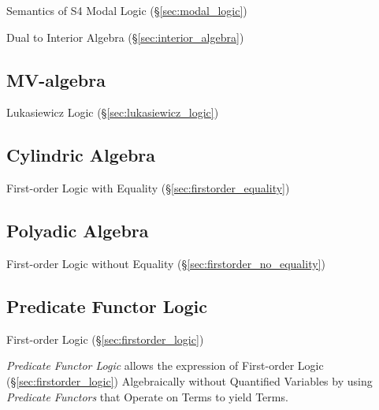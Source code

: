 Semantics of S4 Modal Logic (\S\ref{sec:modal_logic})

Dual to Interior Algebra (\S\ref{sec:interior_algebra})



\subsection{MV-algebra}\label{sec:mv_algebra}

Lukasiewicz Logic (\S\ref{sec:lukasiewicz_logic})



\subsection{Cylindric Algebra}\label{sec:cylindric_algebra}

First-order Logic with Equality (\S\ref{sec:firstorder_equality})



\subsection{Polyadic Algebra}\label{sec:polyadic_algebra}

First-order Logic without Equality
(\S\ref{sec:firstorder_no_equality})



\subsection{Predicate Functor Logic}\label{sec:pfl}

First-order Logic (\S\ref{sec:firstorder_logic})

\emph{Predicate Functor Logic} allows the expression of First-order
Logic (\S\ref{sec:firstorder_logic}) Algebraically without Quantified
Variables by using \emph{Predicate Functors} that Operate on Terms to
yield Terms.



